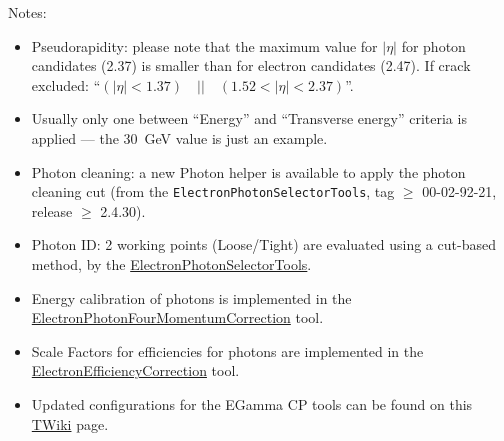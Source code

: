 Notes:
\begin{itemize}
\item Pseudorapidity: please note that the maximum value for \(|\eta|\) for photon candidates (2.37) is smaller than for electron candidates (2.47). 
  If crack excluded: \enquote{\((|\eta| < 1.37) \quad || \quad (1.52 < |\eta| < 2.37)\)}.
\item Usually only one between \enquote{Energy} and \enquote{Transverse energy} criteria is applied --- the \qty{30}{\GeV} value is just an example.
\item Photon cleaning: a new Photon helper is available to apply the photon cleaning cut 
  (from the \texttt{ElectronPhotonSelectorTools}, tag \(\ge\) 00-02-92-21, release \(\ge\) 2.4.30).
\item Photon ID\@: 2 working points (Loose/Tight) are evaluated using a cut-based method, by the
  \href{https://twiki.cern.ch/twiki/bin/view/AtlasProtected/EGammaIdentificationRun2}{ElectronPhotonSelectorTools}.
\item Energy calibration of photons is implemented in the\\
  \href{https://twiki.cern.ch/twiki/bin/view/AtlasProtected/ElectronPhotonFourMomentumCorrection}{ElectronPhotonFourMomentumCorrection} tool.
\item Scale Factors for efficiencies for photons are implemented in the\\
  \href{https://twiki.cern.ch/twiki/bin/view/AtlasProtected/XAODElectronEfficiencyCorrectionTool}{ElectronEfficiencyCorrection} tool.
\item Updated configurations for the EGamma CP tools can be found on this \href{https://twiki.cern.ch/twiki/bin/view/AtlasProtected/EGammaRecommendationsR21}{TWiki} page.
\end{itemize}
